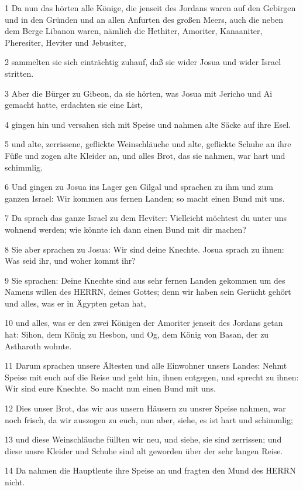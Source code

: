 \par 1 Da nun das hörten alle Könige, die jenseit des Jordans waren auf den Gebirgen und in den Gründen und an allen Anfurten des großen Meers, auch die neben dem Berge Libanon waren, nämlich die Hethiter, Amoriter, Kanaaniter, Pheresiter, Heviter und Jebusiter,
\par 2 sammelten sie sich einträchtig zuhauf, daß sie wider Josua und wider Israel stritten.
\par 3 Aber die Bürger zu Gibeon, da sie hörten, was Josua mit Jericho und Ai gemacht hatte, erdachten sie eine List,
\par 4 gingen hin und versahen sich mit Speise und nahmen alte Säcke auf ihre Esel.
\par 5 und alte, zerrissene, geflickte Weinschläuche und alte, geflickte Schuhe an ihre Füße und zogen alte Kleider an, und alles Brot, das sie nahmen, war hart und schimmlig.
\par 6 Und gingen zu Josua ins Lager gen Gilgal und sprachen zu ihm und zum ganzen Israel: Wir kommen aus fernen Landen; so macht einen Bund mit uns.
\par 7 Da sprach das ganze Israel zu dem Heviter: Vielleicht möchtest du unter uns wohnend werden; wie könnte ich dann einen Bund mit dir machen?
\par 8 Sie aber sprachen zu Josua: Wir sind deine Knechte. Josua sprach zu ihnen: Was seid ihr, und woher kommt ihr?
\par 9 Sie sprachen: Deine Knechte sind aus sehr fernen Landen gekommen um des Namens willen des HERRN, deines Gottes; denn wir haben sein Gerücht gehört und alles, was er in Ägypten getan hat,
\par 10 und alles, was er den zwei Königen der Amoriter jenseit des Jordans getan hat: Sihon, dem König zu Hesbon, und Og, dem König von Basan, der zu Astharoth wohnte.
\par 11 Darum sprachen unsere Ältesten und alle Einwohner unsers Landes: Nehmt Speise mit euch auf die Reise und geht hin, ihnen entgegen, und sprecht zu ihnen: Wir sind eure Knechte. So macht nun einen Bund mit uns.
\par 12 Dies unser Brot, das wir aus unsern Häusern zu unsrer Speise nahmen, war noch frisch, da wir auszogen zu euch, nun aber, siehe, es ist hart und schimmlig;
\par 13 und diese Weinschläuche füllten wir neu, und siehe, sie sind zerrissen; und diese unsre Kleider und Schuhe sind alt geworden über der sehr langen Reise.
\par 14 Da nahmen die Hauptleute ihre Speise an und fragten den Mund des HERRN nicht.
